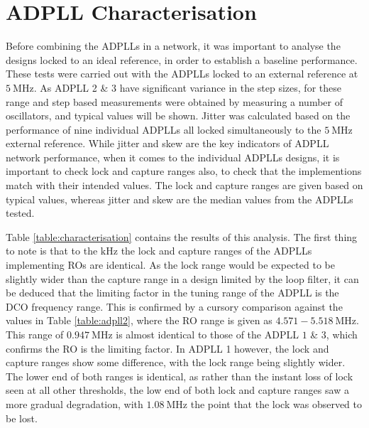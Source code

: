 \section{\acs{ADPLL} Characterisation}
Before combining the \acp{ADPLL} in a network, it was important to analyse the designs locked to an ideal reference, in order to establish a baseline performance. These tests were carried out with the \acp{ADPLL} locked to an external reference at $5~\si{\mega\hertz}$. As \ac{ADPLL} 2 \& 3 have significant variance in the step sizes, for these range and step based measurements were obtained by measuring a number of oscillators, and typical values will be shown. Jitter was calculated based on the performance of nine individual \acp{ADPLL} all locked simultaneously to the $5~\si{\mega\hertz}$ external reference. While jitter and skew are the key indicators of \ac{ADPLL} network performance, when it comes to the individual \acp{ADPLL} designs, it is important to check lock and capture ranges also, to check that the implementions match with their intended values. The lock and capture ranges are given based on typical values, whereas jitter and skew are the median values from the \acp{ADPLL} tested.

Table \ref{table:characterisation} contains the results of this analysis. The first thing to note is that to the $\si{\kilo\hertz}$ the lock and capture ranges of the \acp{ADPLL} implementing \acp{RO} are identical. As the lock range would be expected to be slightly wider than the capture range in a design limited by the loop filter, it can be deduced that the limiting factor in the tuning range of the \ac{ADPLL} is the \ac{DCO} frequency range. This is confirmed by a cursory comparison against the values in Table \ref{table:adpll2}, where the \ac{RO} range is given as $4.571-5.518~\si{\mega\hertz}$. This range of $0.947~\si{\mega\hertz}$ is almost identical to those of the \ac{ADPLL} $1$ \& $3$, which confirms the \ac{RO} is the limiting factor. In \ac{ADPLL} 1 however, the lock and capture ranges show some difference, with the lock range being slightly wider. The lower end of both ranges is identical, as rather than the instant loss of lock seen at all other thresholds, the low end of both lock and capture ranges saw a more gradual degradation, with $1.08~\si{\mega\hertz}$ the point that the lock was observed to be lost.

